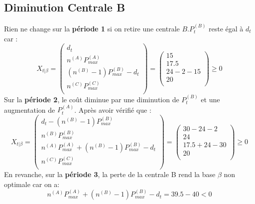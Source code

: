 \documentclass{article}
\begin{document}
\subsection{Diminution Centrale B}
Rien ne change sur la \textbf{période 1} si on retire une centrale $B$.$P_t^{(B)}$ reste égal à $d_t$ car :\\
$$
X_{t|\beta} = \left(
\begin{array}{c}
    d_t \\
    n^{(A)}P_{max}^{(A)} \\
    (n^{(B)}-1)P_{max}^{(B)} - d_t \\
    n^{(C)}P_{max}^{(C)} \\
\end{array}
\right)=
\left(
\begin{array}{c}
    15 \\
    17.5 \\
    24-2-15 \\
    20 \\
\end{array}
\right)
\geq 0
$$
Sur la \textbf{période 2}, le coût diminue par une diminution de $P_t^{(B)}$ et une augmentation de $P_t^{(A)}$.
Après avoir vérifié que : \\
$$
X_{t|\beta} = \left(
\begin{array}{c}
    d_t - (n^{(B)}-1)P_{max}^{(B)} \\
    n^{(B)}P_{max}^{(B)} \\
    n^{(A)}P_{max}^{(A)}+(n^{(B)}-1)P_{max}^{(B)} - d_t \\
    n^{(C)}P_{max}^{(C)} \\
\end{array}
\right)=
\left(
\begin{array}{c}
    30 - 24 -2 \\
    24 \\
   17.5+24-30 \\
    20 \\
\end{array}
\right)
\geq 0
$$
En revanche, sur la \textbf{période 3}, la perte de la centrale B rend la base $\beta$ non optimale car on a:
$$
n^{(A)}P_{max}^{(A)}+(n^{(B)}-1)P_{max}^{(B)} - d_t=39.5-40<0
$$
\end{document}
